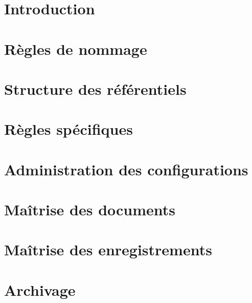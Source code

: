 \documentclass[asi]{picINSA}
\begin{document}
 \couverture{}
 \informationsGenerales{}
  
 \tableofcontents
 
 \chapter*{Introduction}
 
 
 \chapter{Règles de nommage}
 \label{chap regle nommage}
 

 \chapter{Structure des référentiels}
 \label{chap struc ref}
  

 \chapter{Règles spécifiques}
 \label{chap regles specifiques}
  

 \chapter{Administration des configurations}
  

 \chapter{Maîtrise des documents}
  

\chapter{Maîtrise des enregistrements}
 

 \chapter{Archivage}
  \label{archivages}
  
\end{document}
